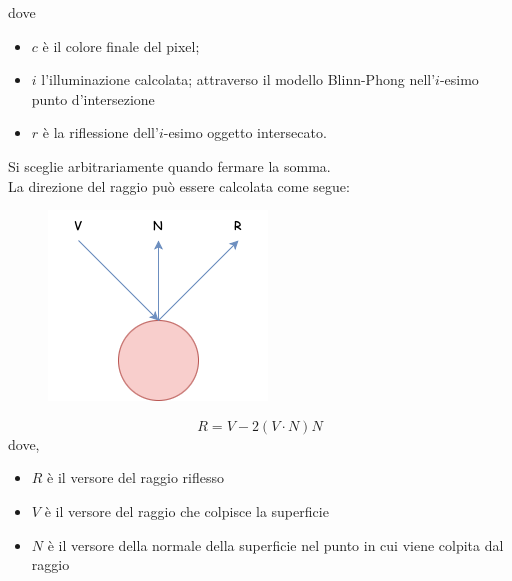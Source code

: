 \documentclass[9pt,a4paper,twoside]{tau}
\begin{document}
dove 
\begin{itemize}
	\item $c$ è il colore finale del pixel;
	\item $i$ l'illuminazione calcolata; attraverso il modello Blinn-Phong nell'$i$-esimo punto d'intersezione
	\item $r$ è la riflessione dell'$i$-esimo oggetto intersecato.
\end{itemize}
Si sceglie arbitrariamente quando fermare la somma.\\
La direzione del raggio può essere calcolata come segue:
\begin{figure}[H]
    \centering
    \includegraphics[width=0.7\columnwidth]{Figures/21.png}
    \caption{}
    \label{fig:figure}
\end{figure}
\begin{equation*}
	R = V - 2(V \cdot N)N
\end{equation*}
dove,
\begin{itemize}
	\item $R$ è il versore del raggio riflesso
	\item $V$ è il versore del raggio che colpisce la superficie
	\item $N$ è il versore della normale della superficie nel punto in cui viene colpita dal raggio
\end{itemize}
\end{document}
